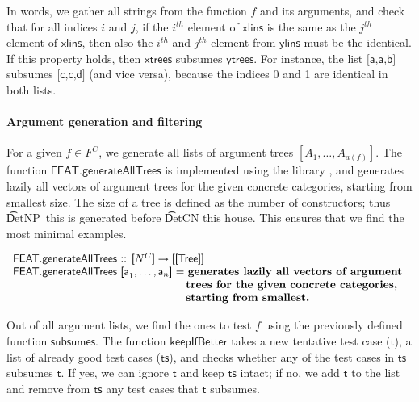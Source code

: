 In words, we gather all strings from the function $f$ and its
arguments, and check that for all indices $i$ and $j$, if the $i^{th}$
element of $\textsf{xlins}$ is the same as the $j^{th}$ element of
$\textsf{xlins}$, then also the $i^{th}$ and $j^{th}$ element from
$\textsf{ylins}$ must be the identical.  If this property holds, then
$\textsf{xtrees}$ subsumes $\textsf{ytrees}$.  For instance, the list
$\textsf{[a,a,b]}$ subsumes $\textsf{[c,c,d]}$ (and vice versa),
because the indices 0 and 1 are identical in both lists.


\paragraph{Argument generation and filtering}
For a given $f \in F^C$, we generate all lists of argument trees
$[A_1, \dots, A_{a(f)}]$.
The function $\textsf{FEAT.generateAllTrees}$ is implemented using the
\feat{} library \cite{feat}, and generates lazily all vectors of
argument trees for the given concrete categories, starting from
smallest size.  The size of a tree is defined as the number of
constructors; thus \t{DetNP~this} is generated before \t{DetCN this
  house}. This ensures that we find the most minimal examples.


\begin{EmptyItem}
$\begin{array}{p{5.25cm} l}
\multicolumn{2}{l}{\textsf{FEAT.generateAllTrees :: [}N^C\textsf{]} \rightarrow \textsf{[[Tree]]}} \\
\multicolumn{2}{l}{\textsf{FEAT.generateAllTrees [a}_1,\ldots,\textsf{a}_n\textsf{] = } \textbf{generates lazily all vectors of argument }} \\
                                                                & \textbf{trees for the given concrete categories,} \\
                                                                & \textbf{starting from smallest.} \\
\end{array}$
\end{EmptyItem}


Out of all argument lists, we find the ones to test $f$
using the previously defined function $\textsf{subsumes}$.
The function $\textsf{keepIfBetter}$ takes a new tentative test case
($\textsf{t}$), a list of already good test cases ($\textsf{ts}$), and
checks whether any of the test cases in $\textsf{ts}$ subsumes
$\textsf{t}$. If yes, we can ignore $\textsf{t}$ and keep
$\textsf{ts}$ intact; if no, we add $\textsf{t}$ to the list and
remove from $\textsf{ts}$ any test cases that $\textsf{t}$ subsumes.

